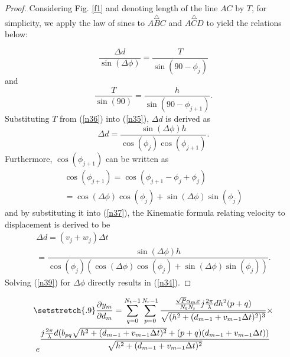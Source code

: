 \documentclass{ieeeaccess}
\begin{document}
\begin{proof}
Considering Fig. \ref{f1} and denoting length of the line $AC$ by $T$, for simplicity, we apply the law of sines to $\overset{\triangle}{ABC}$ and $\overset{\triangle}{ACD}$ to yield the relations below:

\begin{equation}\label{n35}
\dfrac{\Delta d}{\sin (\Delta \phi)} = \dfrac{T}{\sin(90- \phi _j)}
\end{equation}
and
\begin{equation}\label{n36}
\dfrac{T}{\sin (90)} = \dfrac{h}{\sin(90- \phi _{j+1})}.
\end{equation}
Substituting $T$ from (\ref{n36}) into (\ref{n35}), $\Delta{d}$ is derived as
\begin{equation}\label{n37}
\Delta{d}=\dfrac{\sin (\Delta \phi)h}{\operatorname{cos}(\phi _j)\operatorname{cos}(\phi _{j+1})}.
\end{equation}
Furthermore, $\operatorname{cos}(\phi _{j+1})$ can be written as
\begin{multline}\label{n38}
\operatorname{cos}(\phi _{j+1}) = \cos (\phi _{j+1} - \phi_j+\phi _j)\\ =\cos (\Delta \phi)\operatorname{cos}(\phi _j)+\sin(\Delta \phi) \sin(\phi _j)
\end{multline}
and by substituting it into (\ref{n37}), the Kinematic formula relating velocity to displacement is derived to be
\begin{multline}\label{n39}
\Delta d= (v_j +w_j)\Delta t\\ = \dfrac{\sin (\Delta\phi)h}{\operatorname{cos}(\phi _j)(\cos (\Delta \phi)\operatorname{cos}(\phi _j)+\sin(\Delta \phi) \sin(\phi _j))}.
\end{multline}
Solving (\ref{n39}) for $\Delta \phi$ directly results in (\ref{n34}).
\end{proof}



\begin{figure*}[!t] %
\normalsize
\begin{multline}
\setstretch{.9}
\frac{\partial y_m}{\partial d_m} = \sum\limits_{q=0}^{N_\textrm{t}-1} \sum\limits_{p=0}^{N_\textrm{r}-1} \dfrac{\frac{\sqrt{P}\alpha_mx}{N_\textrm{t}N_\textrm{r}}j\frac{2\pi}{\lambda}dh^2(p+q)}{\sqrt{(h^2+(d_{m-1} + v_{m-1}\Delta t)^2)^3}} \times \\ e^{\dfrac{j\frac{2\pi}{\lambda}d(b_{pq}\sqrt{h^2+(d_{m-1} + v_{m-1}\Delta t)^2} + (p+q)(d_{m-1} + v_{m-1}\Delta t)  )  }{\sqrt{h^2+(d_{m-1} + v_{m-1}\Delta t)^2}}} \label{n46}
\end{multline}
\hrulefill
\end{figure*}
\end{document}
